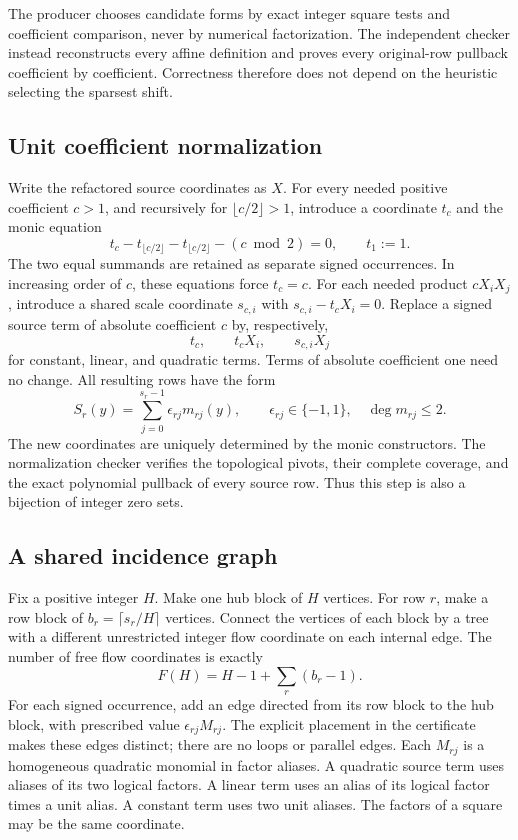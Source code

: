 The producer chooses candidate forms by exact integer square tests and
coefficient comparison, never by numerical factorization. The independent
checker instead reconstructs every affine definition and proves every
original-row pullback coefficient by coefficient. Correctness therefore
does not depend on the heuristic selecting the sparsest shift.

\subsection{Unit coefficient normalization}
Write the refactored source coordinates as \(X\). For every needed positive
coefficient \(c>1\), and recursively for \(\lfloor c/2\rfloor>1\),
introduce a coordinate \(t_c\) and the monic equation
\[
 t_c-t_{\lfloor c/2\rfloor}-t_{\lfloor c/2\rfloor}
       -(c\bmod 2)=0,
 \qquad t_1:=1.
\]
The two equal summands are retained as separate signed occurrences. In
increasing order of \(c\), these equations force \(t_c=c\). For each
needed product \(cX_iX_j\), introduce a shared scale coordinate
\(s_{c,i}\) with \(s_{c,i}-t_cX_i=0\). Replace a signed source term of
absolute coefficient \(c\) by, respectively,
\[
  t_c,\qquad t_cX_i,\qquad s_{c,i}X_j
\]
for constant, linear, and quadratic terms. Terms of absolute coefficient
one need no change. All resulting rows have the form
\[
 S_r(y)=\sum_{j=0}^{s_r-1}\epsilon_{rj}m_{rj}(y),
 \qquad \epsilon_{rj}\in\{-1,1\},\quad \deg m_{rj}\leq2.
\]
The new coordinates are uniquely determined by the monic constructors.
The normalization checker verifies the topological pivots, their complete
coverage, and the exact polynomial pullback of every source row. Thus this
step is also a bijection of integer zero sets.

\subsection{A shared incidence graph}
Fix a positive integer \(H\). Make one hub block of \(H\) vertices. For
row \(r\), make a row block of \(b_r=\lceil s_r/H\rceil\) vertices.
Connect the vertices of each block by a tree with a different unrestricted
integer flow coordinate on each internal edge. The number of free flow
coordinates is exactly
\[
 F(H)=H-1+\sum_r(b_r-1).
\]
For each signed occurrence, add an edge directed from its row block to
the hub block, with prescribed value \(\epsilon_{rj}M_{rj}\).
The explicit placement in the certificate makes these edges distinct;
there are no loops or parallel edges. Each \(M_{rj}\) is a homogeneous
quadratic monomial in factor aliases. A quadratic source term uses aliases
of its two logical factors. A linear term uses an alias of its logical
factor times a unit alias. A constant term uses two unit aliases. The
factors of a square may be the same coordinate.

